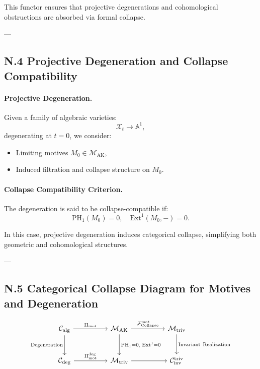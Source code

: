 \documentclass[11pt]{article}
\begin{document}
This functor ensures that projective degenerations and cohomological obstructions are absorbed via formal collapse.

---

\subsection*{N.4 Projective Degeneration and Collapse Compatibility}

\paragraph{Projective Degeneration.}
Given a family of algebraic varieties:
\[
\mathcal{X}_t \to \mathbb{A}^1,
\]
degenerating at \( t = 0 \), we consider:
\begin{itemize}
  \item Limiting motives \( M_0 \in \mathcal{M}_{\mathrm{AK}} \),
  \item Induced filtration and collapse structure on \( M_0 \).
\end{itemize}

\paragraph{Collapse Compatibility Criterion.}
The degeneration is said to be collapse-compatible if:
\[
\mathrm{PH}_1(M_0) = 0, \quad \mathrm{Ext}^1(M_0, -) = 0.
\]

In this case, projective degeneration induces categorical collapse, simplifying both geometric and cohomological structures.

---

\subsection*{N.5 Categorical Collapse Diagram for Motives and Degeneration}

\[
\begin{tikzcd}[column sep=huge, row sep=large]
\mathcal{C}_{\mathrm{alg}} \arrow[r, "{\Pi_{\mathrm{mot}}}"] \arrow[d, "{\mathrm{Degeneration}}"']
& \mathcal{M}_{\mathrm{AK}} \arrow[r, "{\mathcal{F}_{\mathrm{Collapse}}^{\mathrm{mot}}}"] \arrow[d, "{\mathrm{PH}_1 = 0,\; \mathrm{Ext}^1 = 0}"]
& \mathcal{M}_{\mathrm{triv}} \arrow[d, "{\mathrm{Invariant\ Realization}}"] \\
\mathcal{C}_{\mathrm{deg}} \arrow[r, "{\Pi_{\mathrm{mot}}^{\mathrm{deg}}}"]
& \mathcal{M}_{\mathrm{triv}} \arrow[r]
& \mathcal{C}_{\mathrm{inv}}^{\mathrm{triv}}
\end{tikzcd}
\]
\end{document}
